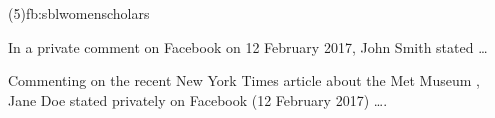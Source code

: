\documentclass[a4paper]{article}
\begin{document}
\examplecite(5){fb:sblwomenscholars}
\begin{verbcite}
  In a private comment on Facebook on 12 February 2017, John Smith stated …
\end{verbcite}
\begin{verbcite}
  Commenting on the recent New York Times article about the Met Museum
  \parencite{barone:2017}, Jane Doe stated privately on Facebook (12 February
  2017) ….
\end{verbcite}
\examplebibliography
{}
\end{document}
